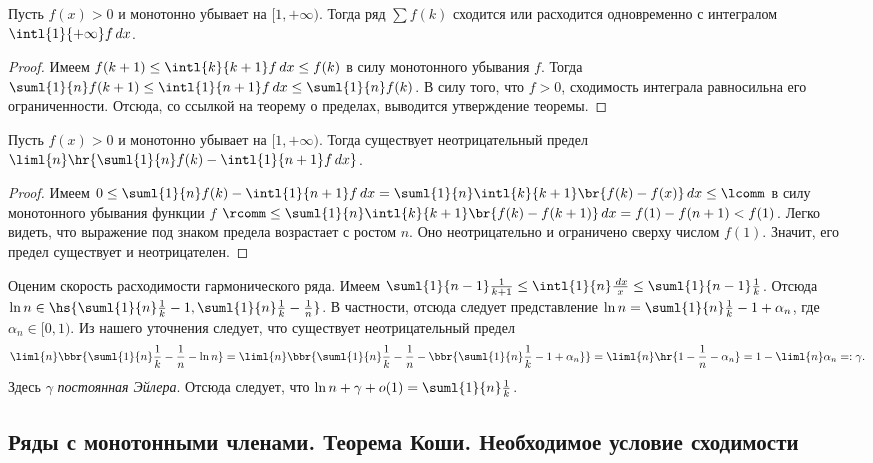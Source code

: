 \documentclass[a4paper]{article}
\begin{document}
\begin{theorem}
Пусть $f(x)>0$ и монотонно убывает на $[1, +\infty)$. Тогда ряд $\sum f(k)$ сходится или расходится
одновременно с интегралом $\intl{1}{+\infty} f\,d x$.
\end{theorem}
\begin{proof}
Имеем $f(k+1) \le \intl{k}{k+1}f\,d x \le f(k)$ в силу монотонного убывания $f$. Тогда
$\suml{1}{n} f(k+1) \le \intl{1}{n+1}f\,d x \le \suml{1}{n}f(k)$. В силу того, что $f > 0$,
сходимость интеграла равносильна его ограниченности. Отсюда, со ссылкой на теорему о пределах,
выводится утверждение теоремы.
\end{proof}

\begin{theorem}
Пусть $f(x)>0$ и монотонно убывает на $[1, +\infty)$. Тогда существует неотрицательный предел
$\liml{n} \hr{ \suml{1}{n}f(k) - \intl{1}{n+1}f\,d x}$.
\end{theorem}
\begin{proof}
Имеем $0 \le \suml{1}{n}f(k) - \intl{1}{n+1}f\,d x=\suml{1}{n}\intl{k}{k+1}\br{f(k)-f(x)}\,d x
\le \lcomm$ в силу монотонного убывания функции $f$ $\rcomm \le
\suml{1}{n}\intl{k}{k+1}\br{f(k)-f(k+1)}\,d x=f(1)-f(n+1) < f(1)$. Легко видеть, что выражение под
знаком предела возрастает с ростом $n$. Оно неотрицательно и ограничено сверху числом $f(1)$.
Значит, его предел существует и неотрицателен.
\end{proof}

\begin{ex}
Оценим скорость расходимости гармонического ряда. Имеем $\suml{1}{n-1}\frac{1}{k+1} \le
\intl{1}{n}\frac{\,d x}{x} \le \suml{1}{n-1} \frac{1}{k}$. Отсюда $\ln n \in
\hs{\suml{1}{n}\frac{1}{k}- 1, \suml{1}{n}\frac{1}{k} - \frac{1}{n}}$. В частности, отсюда следует
представление $\ln n = \suml{1}{n}\frac{1}{k} - 1 + \alpha_n$, где $\alpha_n \in [0,1)$. Из нашего
уточнения следует, что существует неотрицательный предел
$$\liml{n}\bbr{ \suml{1}{n}\frac{1}{k} -
\frac{1}{n} - \ln n} = \liml{n}\bbr{ \suml{1}{n}\frac{1}{k} - \frac{1}{n} - \bbr{
\suml{1}{n}\frac{1}{k} - 1 + \alpha_n}} = \liml{n}\hr{ 1 - \frac{1}{n} - \alpha_n} =
1-\liml{n}\alpha_n =: \gamma.$$ Здесь $\gamma$ \emph{постоянная Эйлера}. Отсюда следует, что
$\ln n + \gamma + o(1) = \suml{1}{n}\frac{1}{k}$.
\end{ex}

\subsection{Ряды с монотонными членами. Теорема Коши. Необходимое условие сходимости}
\end{document}

